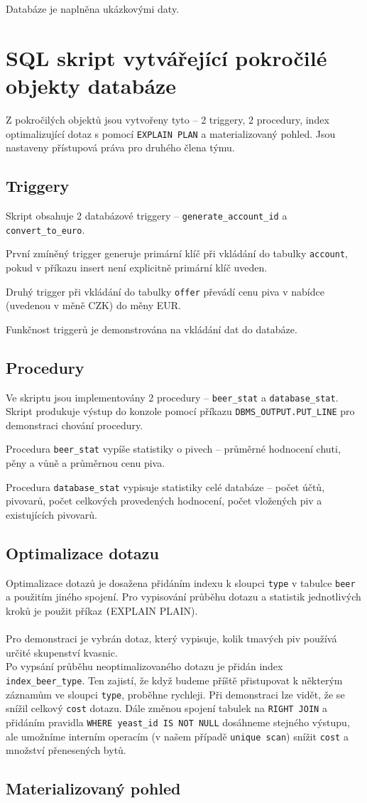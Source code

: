 \documentclass[a4paper, 11pt]{article}
\begin{document}
Databáze je naplněna ukázkovými daty.


\section{SQL skript vytvářející pokročilé objekty databáze}
Z pokročilých objektů jsou vytvořeny tyto – 2 triggery, 2 procedury, index optimalizující dotaz s pomocí \texttt{EXPLAIN PLAN} a materializovaný pohled. Jsou nastaveny přístupová práva pro druhého člena týmu.

\subsection{Triggery}
Skript obsahuje 2 databázové triggery – \texttt{generate\_account\_id} a \texttt{convert\_to\_euro}.


První zmíněný trigger generuje primární klíč při vkládání do tabulky \texttt{account}, pokud v příkazu insert není explicitně primární klíč uveden.


Druhý trigger při vkládání do tabulky \texttt{offer} převádí cenu piva v nabídce (uvedenou v měně CZK) do měny EUR. 


Funkčnost triggerů je demonstrována na vkládání dat do databáze. 

\subsection{Procedury}
Ve skriptu jsou implementovány 2 procedury – \texttt{beer\_stat} a \texttt{database\_stat}. 
Skript produkuje výstup do konzole pomocí příkazu \texttt{DBMS\_OUTPUT.PUT\_LINE} pro demonstraci chování procedury. 


Procedura \texttt{beer\_stat} vypíše statistiky o pivech – průměrné hodnocení chuti, pěny a vůně a průměrnou cenu piva. 


Procedura \texttt{database\_stat} vypisuje statistiky celé databáze – počet účtů, pivovarů, počet celkových provedených hodnocení, počet vložených piv a existujících pivovarů. 

\subsection{Optimalizace dotazu}

Optimalizace dotazů je dosažena přidáním indexu k sloupci \texttt{type} v tabulce \texttt{beer} a použitím jiného spojení. Pro vypisování průběhu dotazu a statistik jednotlivých kroků je použit příkaz \texttt(EXPLAIN PLAIN).  \\ \\
Pro demonstraci je vybrán dotaz, který vypisuje, kolik tmavých piv používá určité skupenství kvasnic.\\
Po vypsání průběhu neoptimalizovaného dotazu je přidán index \texttt{index\_beer\_type}. Ten zajistí, že když budeme příště přistupovat k některým záznamům ve sloupci \texttt{type}, proběhne rychleji. Při demonstraci lze vidět, že se snížil celkový \texttt{cost} dotazu. Dále změnou spojení tabulek na \texttt{RIGHT JOIN} a přidáním pravidla \texttt{WHERE yeast\_id IS NOT NULL} dosáhneme stejného výstupu, ale umožníme interním operacím (v našem případě \texttt{unique scan}) snížit \texttt{cost} a množství přenesených bytů.
\subsection{Materializovaný pohled}
\end{document}
